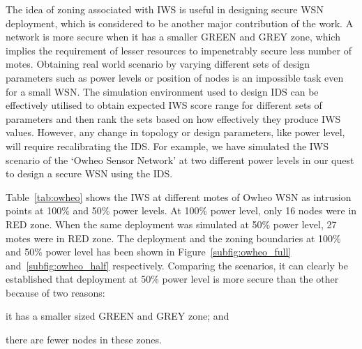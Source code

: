\documentclass{CRPITStyle}
\begin{document}
The idea of zoning associated with IWS is useful in designing secure WSN deployment, which is considered to be another major contribution of the work.
A network is more secure when it has a smaller GREEN and GREY zone, which implies the requirement of lesser resources to impenetrably secure less number of motes.
Obtaining real world scenario by varying different sets of design parameters such as power levels or position of nodes is an impossible task even for a small WSN.
The simulation environment used to design IDS can be effectively utilised to obtain expected IWS score range for different sets of parameters and then rank the sets based on how effectively they produce IWS values. 
However, any change in topology or design parameters, like power level, will require recalibrating the IDS. 
For example, we have simulated the IWS scenario of the `Owheo Sensor Network' 
at two different power levels in our quest to design a secure WSN using the IDS.

Table~\ref{tab:owheo} shows the IWS at different motes of Owheo WSN as intrusion points at 100\% and 50\% power levels. 
At 100\% power level, %
only 16 nodes were in RED zone.
When the same deployment was simulated at 50\% power level, %
27 motes were in RED zone.
The deployment and the zoning boundaries at 100\% and  50\% power level has been shown in Figure~\ref{subfig:owheo_full} and~\ref{subfig:owheo_half} respectively.
Comparing the scenarios, it can clearly be established that deployment at 50\% power level is more secure than the other because of two reasons:
\begin{inparaenum}
\item it has a smaller sized GREEN and GREY zone; and 
\item there are fewer nodes in these zones. 
\end{inparaenum}
\end{document}
